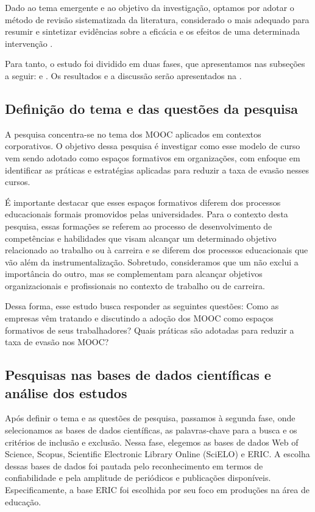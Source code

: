 \documentclass[portuguese]{textolivre}
\begin{document}
Dado ao tema emergente e ao objetivo da investigação, optamos por adotar o método de revisão sistematizada da literatura, considerado o mais adequado para resumir e sintetizar evidências sobre a eficácia e os efeitos de uma determinada intervenção \cite{sampaio_estudos_2007}.

Para tanto, o estudo foi dividido em duas fases, que apresentamos nas subseções a seguir:   e  . Os resultados e a discussão serão apresentados na  .  


\subsection{Definição do tema e das questões da pesquisa}\label{sec-conduta}
A pesquisa concentra-se no tema dos MOOC aplicados em contextos corporativos. O objetivo dessa pesquisa é investigar como esse modelo de curso vem sendo adotado como espaços formativos em organizações, com enfoque em identificar as práticas e estratégias aplicadas para reduzir a taxa de evasão nesses cursos. 

É importante destacar que esses espaços formativos diferem dos processos educacionais formais promovidos pelas universidades. Para o contexto desta pesquisa, essas formações se referem ao processo de desenvolvimento de competências e habilidades que visam alcançar um determinado objetivo relacionado ao trabalho ou à carreira e se diferem dos processos educacionais que vão além da instrumentalização. Sobretudo, consideramos que um não exclui a importância do outro, mas se complementam para alcançar objetivos organizacionais e profissionais no contexto de trabalho ou de carreira.

Dessa forma, esse estudo busca responder as seguintes questões: Como as empresas vêm tratando e discutindo a adoção dos MOOC como espaços formativos de seus trabalhadores? Quais práticas são adotadas para reduzir a taxa de evasão nos MOOC?


\subsection{Pesquisas nas bases de dados científicas e análise dos estudos}\label{sec-fmt-manuscrito}
Após definir o tema e as questões de pesquisa, passamos à segunda fase, onde selecionamos as bases de dados científicas, as palavras-chave para a busca e os critérios de inclusão e exclusão. Nessa fase, elegemos as bases de dados Web of Science, Scopus, Scientific Electronic Library Online (SciELO) e ERIC. A escolha dessas bases de dados foi pautada pelo reconhecimento em termos de confiabilidade e pela amplitude de periódicos e publicações disponíveis. Especificamente, a base ERIC foi escolhida por seu foco em produções na área de educação.
\end{document}
